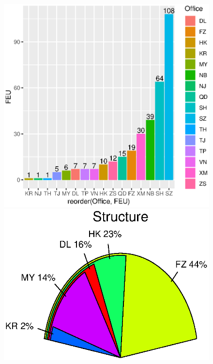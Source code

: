 \documentclass[a4paper]{book}
\begin{document}
		\begin{figure}
		\begin{center}
		\includegraphics{Rplot04}
		\includegraphics{Rplot09}
		\end{center}
		\end{figure}
\end{document}
